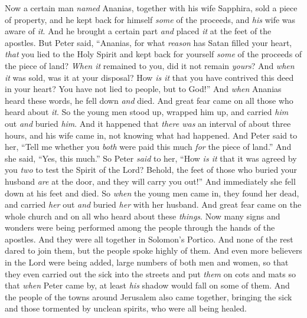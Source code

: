 \begin{biblechapter} %
 Now a certain man \textit{named} Ananias, together with his wife Sapphira, sold a piece of property,
\verse and he kept back for himself \textit{some} of the proceeds, and \textit{his} wife was aware of \textit{it}. And he brought a certain part \textit{and} placed \textit{it} at the feet of the apostles.
\verse But Peter said, “Ananias, for what \textit{reason} has Satan filled your heart, \textit{that} you lied to the Holy Spirit and kept back for yourself \textit{some} of the proceeds of the piece of land?
\verse \textit{When it} remained to you, did it not remain \textit{yours}? And \textit{when it} was sold, was it at your disposal? How \textit{is it} that you have contrived this deed in your heart? You have not lied to people, but to God!”
\verse And \textit{when} Ananias heard these words, he fell down \textit{and} died. And great fear came on all those who heard about \textit{it}.
\verse So the young men stood up, wrapped him up, and carried \textit{him} out \textit{and} buried \textit{him}.
\verse And it happened that \textit{there was} an interval of about three hours, and his wife came in, not knowing what had happened.
\verse And Peter said to her, “Tell me whether you \textit{both} were paid this much \textit{for} the piece of land.” And she said, “Yes, this much.”
\verse So Peter \textit{said} to her, “How \textit{is it} that it was agreed by you \textit{two} to test the Spirit of the Lord? Behold, the feet of those who buried your husband \textit{are} at the door, and they will carry you out!”
\verse And immediately she fell down at his feet and died. So \textit{when} the young men came in, they found her dead, and carried \textit{her} out \textit{and} buried \textit{her} with her husband.
\verse And great fear came on the whole church and on all who heard about these \textit{things}.
 Now many signs and wonders were being performed among the people through the hands of the apostles. And they were all together in Solomon’s Portico.
\verse And none of the rest dared to join them, but the people spoke highly of them.
\verse And even more believers in the Lord were being added, large numbers of both men and women,
\verse so that they even carried out the sick into the streets and put \textit{them} on cots and mats so that \textit{when} Peter came by, at least \textit{his} shadow would fall on some of them.
\verse And the people of the towns around Jerusalem also came together, bringing the sick and those tormented by unclean spirits, who were all being healed.

\end{biblechapter}
